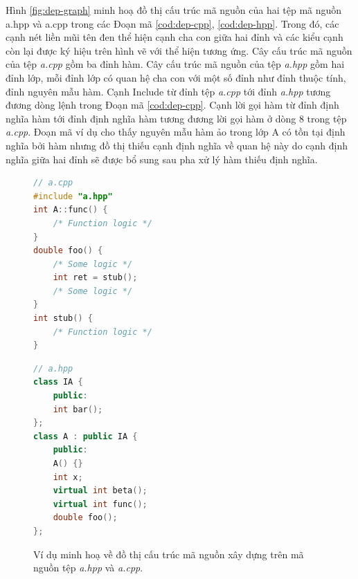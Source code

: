 Hình \autoref{fig:dep-graph} minh hoạ đồ thị cấu trúc mã nguồn của hai tệp mã nguồn a.hpp và a.cpp trong các Đoạn mã \autoref{cod:dep-cpp}, \autoref{cod:dep-hpp}. Trong đó, các cạnh nét liền mũi tên đen thể hiện cạnh cha con giữa hai đỉnh và các kiểu cạnh còn lại được ký hiệu trên hình vẽ với thể hiện tương ứng. Cây cấu trúc mã nguồn của tệp \textit{a.cpp} gồm ba đỉnh hàm. Cây cấu trúc mã nguồn của tệp \textit{a.hpp} gồm hai đỉnh lớp, mỗi đỉnh lớp có quan hệ cha con với một số đỉnh như đỉnh thuộc tính, đỉnh nguyên mẫu hàm. Cạnh Include từ đỉnh tệp \textit{a.cpp} tới đỉnh \textit{a.hpp} tương đương dòng lệnh  trong Đoạn mã \autoref{cod:dep-cpp}. Cạnh lời gọi hàm từ đỉnh định nghĩa hàm  tới đỉnh định nghĩa hàm  tương đương lời gọi hàm ở dòng 8 trong tệp \textit{a.cpp}. Đoạn mã ví dụ cho thấy nguyên mẫu hàm ảo  trong lớp A có tồn tại định nghĩa bởi hàm  nhưng đồ thị thiếu cạnh định nghĩa về quan hệ này do cạnh định nghĩa giữa hai đỉnh sẽ được bổ sung sau pha xử lý hàm thiếu định nghĩa.  

\begin{figure}[H]
	\begin{minipage}[t]{0.49\linewidth}
		\begin{lstlisting}[language=C++, caption={Mã nguồn tệp \textit{a.cpp} minh họa đồ thị cấu trúc mã nguồn.}, label={cod:dep-cpp}, captionpos=b]
// a.cpp
#include "a.hpp"
int A::func() {
	/* Function logic */
}
double foo() {
	/* Some logic */
	int ret = stub();
	/* Some logic */
}
int stub() {
	/* Function logic */
}
		\end{lstlisting}
	\end{minipage}
	\begin{minipage}[t]{0.49\linewidth}
		\begin{lstlisting}[language=C++, caption={Mã nguồn tệp \textit{a.hpp} minh họa đồ thị cấu trúc mã nguồn.}, label={cod:dep-hpp}, captionpos=b]
// a.hpp
class IA {
	public: 
	int bar();
};
class A : public IA {
	public:
	A() {}
	int x;
	virtual int beta();
	virtual int func();
	double foo();
}; 
		\end{lstlisting}
	\end{minipage}
			
	\vspace{1cm}
    
    \caption{Ví dụ minh hoạ về đồ thị cấu trúc mã nguồn xây dựng trên mã nguồn tệp \textit{a.hpp} và \textit{a.cpp}.}
    \label{fig:dep-graph}
\end{figure}

